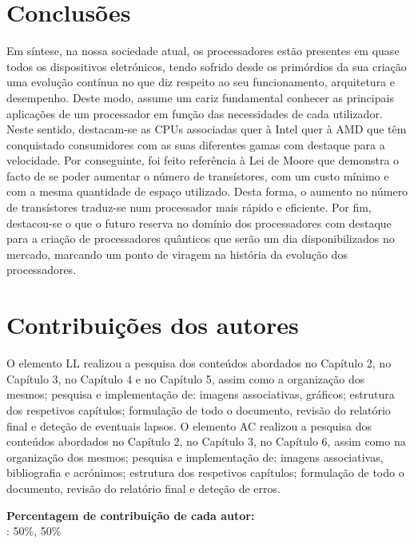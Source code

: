 \documentclass{report}
\begin{document}
\chapter{Conclusões}
\label{chap.conclusao}
Em síntese,  na nossa sociedade atual, os processadores estão presentes em quase todos os dispositivos eletrónicos, tendo sofrido desde os primórdios da sua criação uma evolução contínua no que diz respeito ao seu funcionamento, arquitetura e desempenho. Deste modo, assume um cariz fundamental conhecer as principais aplicações de um processador em função das necessidades de cada utilizador. Neste sentido, destacam-se as \ac{CPU}s associadas quer à \ac{Intel} quer à \ac{AMD} que têm conquistado consumidores com as suas diferentes gamas com destaque para a velocidade. Por conseguinte, foi feito referência à Lei de Moore que demonstra o facto de se poder aumentar o número de transístores, com um custo mínimo e com a mesma quantidade de espaço utilizado. Desta forma, o aumento no número de transístores traduz-se num processador mais rápido e eficiente. Por fim, destacou-se o que o futuro reserva no domínio dos processadores com destaque para a criação de processadores quânticos que serão um dia disponibilizados no mercado, marcando um ponto de viragem na história da evolução dos processadores.

\chapter*{Contribuições dos autores}

O elemento \ac{LL} realizou a pesquisa dos conteúdos abordados no Capítulo 2, no Capítulo 3, no Capítulo 4 e no Capítulo 5, assim como a organização dos mesmos; pesquisa e implementação de: imagens associativas, gráficos; estrutura dos respetivos capítulos; formulação de todo o documento, revisão do relatório final e deteção de eventuais lapsos. 
O elemento \ac{AC} realizou a pesquisa dos conteúdos abordados no Capítulo 2, no Capítulo 3, no Capítulo 6, assim como na organização dos mesmos; pesquisa e implementação de: imagens associativas, bibliografia e acrónimos; estrutura dos respetivos capítulos; formulação de todo o documento, revisão do relatório final e deteção de erros.


\vspace{10pt}
\textbf{Percentagem de contribuição de cada autor:}\\

\autores : 50\%, 50\%\\
\end{document}
